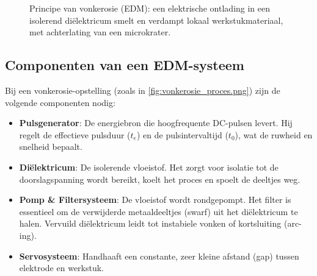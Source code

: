 \documentclass[a4paper,11pt,twoside]{report}
\begin{document}
\begin{figure}[htbp]
    \caption{Principe van vonkerosie (EDM): een elektrische ontlading in een isolerend diëlektricum smelt en verdampt lokaal werkstukmateriaal, met achterlating van een microkrater.}
    \label{fig:vonkerosie_principe}
\end{figure}
\FloatBarrier

\subsection{Componenten van een EDM-systeem}
Bij een vonkerosie-opstelling (zoals in \cref{fig:vonkerosie_proces.png}) zijn de volgende componenten nodig:
\begin{itemize}
    \item \textbf{Pulsgenerator}: De energiebron die hoogfrequente DC-pulsen levert. Hij regelt de effectieve pulsduur ($t_e$) en de pulsintervaltijd ($t_0$), wat de ruwheid en snelheid bepaalt.
    \item \textbf{Diëlektricum}: De isolerende vloeistof. Het zorgt voor isolatie tot de doorslagspanning wordt bereikt, koelt het proces en spoelt de deeltjes weg.
    \item \textbf{Pomp \& Filtersysteem}: De vloeistof wordt rondgepompt. Het filter is essentieel om de verwijderde metaaldeeltjes (swarf) uit het diëlektricum te halen. Vervuild diëlektricum leidt tot instabiele vonken of kortsluiting (arc-ing).
    \item \textbf{Servosysteem}: Handhaaft een constante, zeer kleine afstand (gap) tussen elektrode en werkstuk.
\end{itemize}
\end{document}
